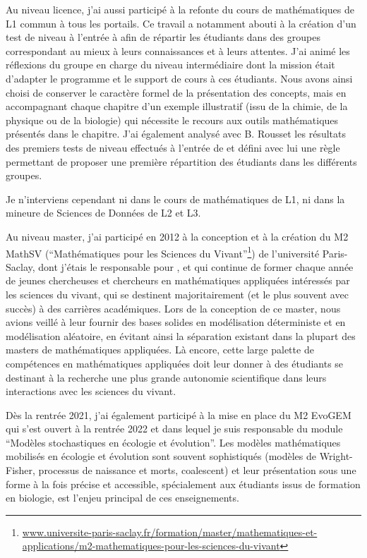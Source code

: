 Au niveau licence, j’ai aussi participé à la refonte du cours de mathématiques de L1 commun à tous les portails. Ce travail a notamment abouti à la création d’un test de niveau à l’entrée à \SU afin de répartir les étudiants dans des groupes correspondant au mieux à leurs connaissances et à leurs attentes. J’ai animé les réflexions du groupe en charge du niveau intermédiaire dont la mission était d’adapter le programme et le support de cours à ces étudiants. Nous avons ainsi choisi de conserver le caractère formel de la présentation des concepts, mais en accompagnant chaque chapitre d’un exemple illustratif (issu de la chimie, de la physique ou de la biologie) qui nécessite le recours aux outils mathématiques présentés dans le chapitre. J’ai également analysé avec B. Rousset les résultats des premiers tests de niveau effectués à l’entrée de \SU et défini avec lui une règle permettant de proposer une première répartition des étudiants dans les différents groupes.

Je n’interviens cependant ni dans le cours de mathématiques de L1, ni dans la mineure de Sciences de Données de L2 et L3.

Au niveau master, j’ai participé en 2012 à la conception et à la création du M2 MathSV (“Mathématiques pour les Sciences du Vivant”\footnote{\url{www.universite-paris-saclay.fr/formation/master/mathematiques-et-applications/m2-mathematiques-pour-les-sciences-du-vivant}}) de l’université Paris-Saclay, dont j’étais le responsable pour \APT, et qui continue de former chaque année de jeunes chercheuses et chercheurs en mathématiques appliquées intéressés par les sciences du vivant, qui se destinent majoritairement (et le plus souvent avec succès) à des carrières académiques. Lors de la conception de ce master, nous avions veillé à leur fournir des bases solides en modélisation déterministe et en modélisation aléatoire, en évitant ainsi la séparation existant dans la plupart des masters de mathématiques appliquées. Là encore, cette large palette de compétences en mathématiques appliquées doit leur donner à des étudiants se destinant à la recherche une plus grande autonomie scientifique dans leurs interactions avec les sciences du vivant.

Dès la rentrée 2021, j'ai également participé à la mise en place du M2 EvoGEM qui s'est ouvert à la rentrée 2022 et dans lequel je suis responsable du module “Modèles stochastiques en écologie et évolution”. Les modèles mathématiques mobilisés en écologie et évolution sont souvent sophistiqués (modèles de Wright-Fisher, processus de naissance et morts, coalescent) et leur présentation sous une forme à la fois précise et accessible, spécialement aux étudiants issus de formation en biologie, est l’enjeu principal de ces enseignements.

